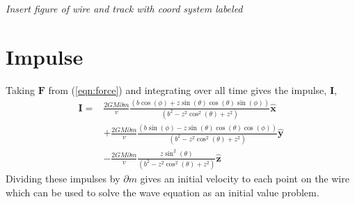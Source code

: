 \documentclass{report}
\begin{document}
\emph{Insert figure of wire and track with coord system labeled}
\section*{Impulse}
Taking $\mathbf{F}$ from (\ref{eqn:force}) and integrating over all time gives the impulse, $\mathbf{I}$,
\begin{align}
    \nonumber\mathbf{I}= & \frac{2 G M \partial m}{v} \frac{(b \cos (\phi )+z \sin (\theta ) \cos (\theta ) \sin (\phi ))}{\left(b^2-z^2 \cos ^2(\theta )+z^2\right)} \mathbf{\hat x}\\
    \nonumber            & +\frac{2 G M \partial m}{v} \frac{(b \sin (\phi )-z \sin (\theta ) \cos (\theta ) \cos (\phi ))}{\left(b^2-z^2 \cos ^2(\theta )+z^2\right)} \mathbf{\hat y}\\
                         &  -\frac{2 G M \partial m}{v} \frac{z \sin ^2(\theta )}{\left(b^2-z^2 \cos ^2(\theta )+z^2\right)} \mathbf{\hat z}
    \label{eqn:impulse}
\end{align}
Dividing these impulses by $\partial m$ gives an initial velocity to each point on the wire which can be used to solve the wave equation as an initial value problem.
\end{document}
